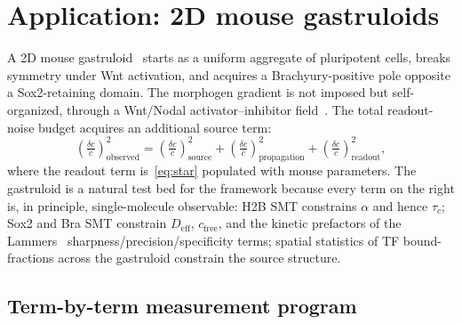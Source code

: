 \documentclass[11pt]{article}
\newcommand{\eff}{\mathrm{eff}}
\begin{document}
\section{Application: 2D mouse gastruloids}
\label{sec:gastruloid}

A 2D mouse gastruloid~\cite{vandenBrink2014,Beccari2018,Moris2020} starts
as a uniform aggregate of pluripotent cells, breaks symmetry under Wnt
activation, and acquires a Brachyury-positive pole opposite a
Sox2-retaining domain. The morphogen gradient is not imposed but
self-organized, through a Wnt/Nodal activator--inhibitor
field~\cite{Muller2012,Etoc2016,Tewary2017}. The total readout-noise
budget acquires an additional source term:
\begin{equation}
  \left(\tfrac{\delta c}{c}\right)^{\!2}_{\!\text{observed}}
  =
  \left(\tfrac{\delta c}{c}\right)^{\!2}_{\!\text{source}}
  +
  \left(\tfrac{\delta c}{c}\right)^{\!2}_{\!\text{propagation}}
  +
  \left(\tfrac{\delta c}{c}\right)^{\!2}_{\!\text{readout}},
  \label{eq:gastruloid_decomp}
\end{equation}
where the readout term is~\eqref{eq:star} populated with mouse parameters.
The gastruloid is a natural test bed for the framework because every term
on the right is, in principle, single-molecule observable: H2B SMT
constrains $\alpha$ and hence $\tau_c$; Sox2 and Bra SMT constrain $D_{\eff}$,
$c_{\mathrm{free}}$, and the kinetic prefactors of the
Lammers~\cite{Lammers2023} sharpness/precision/specificity terms; spatial
statistics of TF bound-fractions across the gastruloid constrain the
source structure.

\subsection{Term-by-term measurement program}
\end{document}
